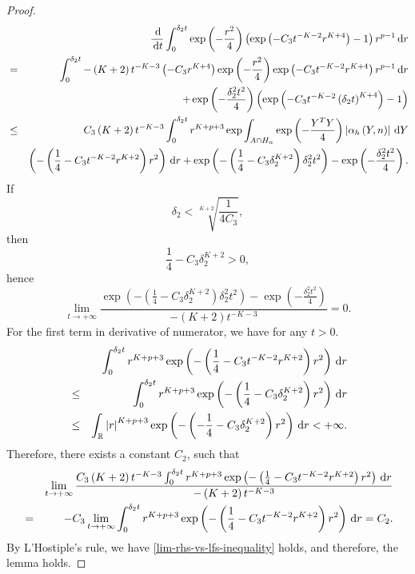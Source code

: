 \begin{proof}
\begin{eqnarray*}
 &  & \frac{\,\mathrm{d}}{\,\mathrm{d} t}\int_{0}^{\delta_{2}t}\exp\left(-\frac{r^{2}}{4}\right)\left(\exp\left(-C_{3}t^{-K-2}r^{K+4}\right)-1\right)r^{p-1}\,\mathrm{d} r\\
 & = & \int_{0}^{\delta_{2}t}-\left(K+2\right)t^{-K-3}\left(-C_{3}r^{K+4}\right)\exp\left(-\frac{r^{2}}{4}\right)\exp\left(-C_{3}t^{-K-2}r^{K+4}\right)r^{p-1}\,\mathrm{d} r\\
 &  & +\exp\left(-\frac{\delta_{2}^{2}t^{2}}{4}\right)\left(\exp\left(-C_{3}t^{-K-2}\left(\delta_{2}t\right)^{K+4}\right)-1\right)\\
 & \le & C_{3}\left(K+2\right)t^{-K-3}\int_{0}^{\delta_{2}t}r^{K+p+3}\exp\int_{A\cap H_{n}}\exp\left(-\frac{Y^{T}Y}{4}\right)\left|\alpha_{h}\left(Y,n\right)\right|\,\mathrm{d} Y\\
 &  & \left(-\left(\frac{1}{4}-C_{3}t^{-K-2}r^{K+2}\right)r^{2}\right)\,\mathrm{d} r+\exp\left(-\left(\frac{1}{4}-C_{3}\delta_{2}^{K+2}\right)\delta_{2}^{2}t^{2}\right)-\exp\left(-\frac{\delta_{2}^{2}t^{2}}{4}\right).
\end{eqnarray*}
If 
\[
\delta_{2}<\sqrt[K+2]{\frac{1}{4C_{3}}},
\]
then 
\[
\frac{1}{4}-C_{3}\delta_{2}^{K+2}>0,
\]
hence 
\[
\lim_{t\rightarrow+\infty}\frac{\exp\left(-\left(\frac{1}{4}-C_{3}\delta_{2}^{K+2}\right)\delta_{2}^{2}t^{2}\right)-\exp\left(-\frac{\delta_{2}^{2}t^{2}}{4}\right)}{-\left(K+2\right)t^{-K-3}}=0.
\]
For the first term in derivative of numerator, we have for any $t>0$.
\begin{eqnarray*}
 &  & \int_{0}^{\delta_{2}t}r^{K+p+3}\exp\left(-\left(\frac{1}{4}-C_{3}t^{-K-2}r^{K+2}\right)r^{2}\right)\,\mathrm{d} r\\
 & \le & \int_{0}^{\delta_{2}t}r^{K+p+3}\exp\left(-\left(\frac{1}{4}-C_{3}\delta_{2}^{K+2}\right)r^{2}\right)\,\mathrm{d} r\\
 & \le & \int_{\mathbb{R}}\left|r\right|^{K+p+3}\exp\left(-\left(-\frac{1}{4}-C_{3}\delta_{2}^{K+2}\right)r^{2}\right)\,\mathrm{d} r<+\infty.
\end{eqnarray*}
Therefore, there exists a constant $C_{2}$, such that 
\begin{eqnarray*}
 &  & \lim_{t\rightarrow+\infty}\frac{C_{3}\left(K+2\right)t^{-K-3}\int_{0}^{\delta_{2}t}r^{K+p+3}\exp\left(-\left(\frac{1}{4}-C_{3}t^{-K-2}r^{K+2}\right)r^{2}\right)\,\mathrm{d} r}{-\left(K+2\right)t^{-K-3}}\\
 & = & -C_{3}\lim_{t\rightarrow+\infty}\int_{0}^{\delta_{2}t}r^{K+p+3}\exp\left(-\left(\frac{1}{4}-C_{3}t^{-K-2}r^{K+2}\right)r^{2}\right)\,\mathrm{d} r=C_{2}.
\end{eqnarray*}
By L'Hostiple's rule, we have \eqref{lim-rhs-vs-lfs-inequality} holds,
and therefore, the lemma holds.\end{proof}
